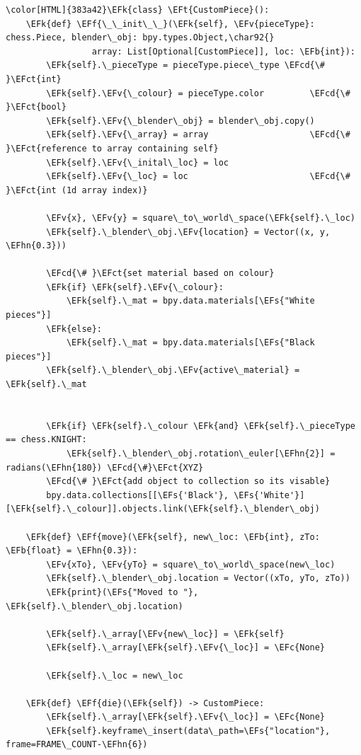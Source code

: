 \documentclass[11pt]{article}
\newcommand{\EFk}[1]{\textcolor{EFk}{#1}} %
\newcommand{\EFt}[1]{\textcolor{EFt}{#1}} %
\newcommand{\EFs}[1]{\textcolor{EFs}{#1}} %
\newcommand{\EFb}[1]{\textcolor{EFb}{#1}} %
\newcommand{\EFct}[1]{\textcolor{EFct}{#1}} %
\newcommand{\EFc}[1]{\textcolor{EFc}{#1}} %
\newcommand{\EFv}[1]{\textcolor{EFv}{#1}} %
\newcommand{\EFf}[1]{\textcolor{EFf}{#1}} %
\newcommand{\EFcd}[1]{\textcolor{EFcd}{#1}} %
\newcommand{\EFhn}[1]{\textcolor{EFhn}{\textbf{#1}}} %
\begin{document}
\begin{Code}
\begin{Verbatim}[]
\color[HTML]{383a42}\EFk{class} \EFt{CustomPiece}():
    \EFk{def} \EFf{\_\_init\_\_}(\EFk{self}, \EFv{pieceType}: chess.Piece, blender\_obj: bpy.types.Object,\char92{}
                 array: List[Optional[CustomPiece]], loc: \EFb{int}):
        \EFk{self}.\_pieceType = pieceType.piece\_type \EFcd{\# }\EFct{int}
        \EFk{self}.\EFv{\_colour} = pieceType.color         \EFcd{\# }\EFct{bool}
        \EFk{self}.\EFv{\_blender\_obj} = blender\_obj.copy()
        \EFk{self}.\EFv{\_array} = array                    \EFcd{\# }\EFct{reference to array containing self}
        \EFk{self}.\EFv{\_inital\_loc} = loc
        \EFk{self}.\EFv{\_loc} = loc                        \EFcd{\# }\EFct{int (1d array index)}

        \EFv{x}, \EFv{y} = square\_to\_world\_space(\EFk{self}.\_loc)
        \EFk{self}.\_blender\_obj.\EFv{location} = Vector((x, y, \EFhn{0.3}))

        \EFcd{\# }\EFct{set material based on colour}
        \EFk{if} \EFk{self}.\EFv{\_colour}:
            \EFk{self}.\_mat = bpy.data.materials[\EFs{"White pieces"}]
        \EFk{else}:
            \EFk{self}.\_mat = bpy.data.materials[\EFs{"Black pieces"}]
        \EFk{self}.\_blender\_obj.\EFv{active\_material} = \EFk{self}.\_mat


        \EFk{if} \EFk{self}.\_colour \EFk{and} \EFk{self}.\_pieceType == chess.KNIGHT:
            \EFk{self}.\_blender\_obj.rotation\_euler[\EFhn{2}] = radians(\EFhn{180}) \EFcd{\#}\EFct{XYZ}
        \EFcd{\# }\EFct{add object to collection so its visable}
        bpy.data.collections[[\EFs{'Black'}, \EFs{'White'}][\EFk{self}.\_colour]].objects.link(\EFk{self}.\_blender\_obj)

    \EFk{def} \EFf{move}(\EFk{self}, new\_loc: \EFb{int}, zTo: \EFb{float} = \EFhn{0.3}):
        \EFv{xTo}, \EFv{yTo} = square\_to\_world\_space(new\_loc)
        \EFk{self}.\_blender\_obj.location = Vector((xTo, yTo, zTo))
        \EFk{print}(\EFs{"Moved to "}, \EFk{self}.\_blender\_obj.location)

        \EFk{self}.\_array[\EFv{new\_loc}] = \EFk{self}
        \EFk{self}.\_array[\EFk{self}.\EFv{\_loc}] = \EFc{None}

        \EFk{self}.\_loc = new\_loc

    \EFk{def} \EFf{die}(\EFk{self}) -> CustomPiece:
        \EFk{self}.\_array[\EFk{self}.\EFv{\_loc}] = \EFc{None}
        \EFk{self}.keyframe\_insert(data\_path=\EFs{"location"}, frame=FRAME\_COUNT-\EFhn{6})


\end{Verbatim}
\end{Code}
\end{document}

